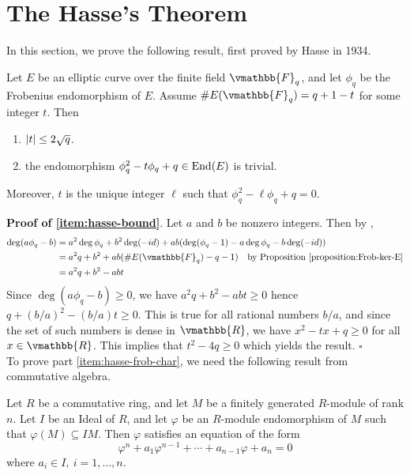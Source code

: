 \section{The Hasse's Theorem}
In this section, we prove the following result, first proved by Hasse \cite{Hasse1934} in 1934. 
\begin{theorem}
\label{theorem:Hasse}
Let $E$ be an elliptic curve over the finite field $\vmathbb{F}_q$, and let $\phi_q$ be the Frobenius 
endomorphism of $E$. Assume $\#E(\vmathbb{F}_q) = q + 1 - t$ for some integer $t$. Then
\begin{enumerate}
\item 
\label{item:hasse-bound}
$\left\vert t\right\vert \le 2 \sqrt{q}$.
\item
\label{item:hasse-frob-char}
the endomorphism $\phi_q^2 - t\phi_q + q \in \operatorname{End}(E)$ is trivial.
\end{enumerate}
Moreover, $t$ is the unique integer $\ell$ such that $\phi_q^2 - \ell\phi_q + q = 0$.
\end{theorem}
\textbf{Proof of \ref{item:hasse-bound}}. Let $a$ and $b$ be nonzero integers. Then by 
,
\begin{align*}
\deg(a\phi_q - b) 
&= a^2\deg \phi_q + b^2\deg(-id) + ab(\deg(\phi_q - 1) -a\deg \phi_q - b\deg(-id)) \\
&= a^2q + b^2 + ab(\#E(\vmathbb{F}_q) - q - 1) \quad \text{by 
\refproposition{proposition:Frob-ker-E}} \\
&= a^2q + b^2 - abt
\end{align*}
Since $\deg(a\phi_q - b) \ge 0$, we have $a^2q + b^2 - abt \ge 0$ hence $q + (b / a)^2 - (b / a)t 
\ge 0$. This is true for all rational numbers $b / a$, and since the set of such numbers is dense in 
$\vmathbb{R}$, we have $x^2 - tx + q \ge 0$ for all $x \in \vmathbb{R}$. This implies that $t^2 - 4q 
\ge 0$ which yields the result. \hfill $\square$\\
To prove part \ref{item:hasse-frob-char}, we need the following result from commutative algebra.
\begin{lemma}
\label{lemma:fg-module-endo}
Let $R$ be a commutative ring, and let $M$ be a finitely generated $R$-module of rank $n$. Let $I$ 
be an Ideal of $R$, and let $\varphi$ be an $R$-module endomorphism of $M$ such that $\varphi(M) 
\subseteq IM$. Then $\varphi$ satisfies an equation of the form
$$
\varphi^n + a_1\varphi^{n - 1} + \cdots + a_{n - 1}\varphi + a_n = 0
$$
where $a_i \in I, \: i = 1, \dots, n$.
\end{lemma}
